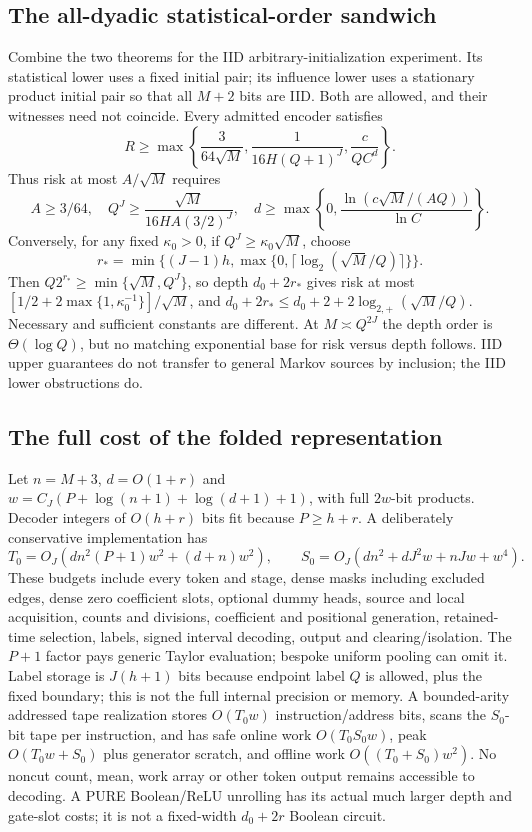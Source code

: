 \documentclass[11pt,letterpaper]{article}
\theoremstyle{definition}\newtheorem{definition}[theorem]{Definition}
\theoremstyle{remark}\newtheorem{remark}[theorem]{Remark}
\begin{document}
\subsection{The all-dyadic statistical-order sandwich}
Combine the two theorems for the IID arbitrary-initialization experiment. Its statistical lower uses a fixed initial pair; its influence lower uses a stationary product initial pair so that all $M+2$ bits are IID. Both are allowed, and their witnesses need not coincide. Every admitted encoder satisfies
\begin{equation}\label{eq:iidsandwich}
 R\ge\max\left\{\frac3{64\sqrt M},\frac1{16H(Q+1)^J},\frac c{QC^d}\right\}.
\end{equation}
Thus risk at most $A/\sqrt M$ requires
\[
 A\ge3/64,\quad Q^J\ge\frac{\sqrt M}{16HA(3/2)^J},\quad
 d\ge\max\left\{0,\frac{\ln(c\sqrt M/(AQ))}{\ln C}\right\}.
\]
Conversely, for any fixed $\kappa_0>0$, if $Q^J\ge\kappa_0\sqrt M$, choose
\[
 r_* =\min\{(J-1)h,\max\{0,\lceil\log_2(\sqrt M/Q)\rceil\}\}.
\]
Then $Q2^{r_*}\ge\min\{\sqrt M,Q^J\}$, so depth $d_0+2r_*$ gives risk at most
$[1/2+2\max\{1,\kappa_0^{-1}\}]/\sqrt M$, and
$d_0+2r_*\le d_0+2+2\log_{2,+}(\sqrt M/Q)$.
Necessary and sufficient constants are different. At $M\asymp Q^{2J}$ the depth order is $\Theta(\log Q)$, but no matching exponential base for risk versus depth follows. IID upper guarantees do not transfer to general Markov sources by inclusion; the IID lower obstructions do.

\subsection{The full cost of the folded representation}
Let $n=M+3$, $d=O(1+r)$ and
$w=C_J(P+\log(n+1)+\log(d+1)+1)$, with full $2w$-bit products. Decoder integers of $O(h+r)$ bits fit because $P\ge h+r$. A deliberately conservative implementation has
\[
 T_0=O_J(dn^2(P+1)w^2+(d+n)w^2),\qquad
 S_0=O_J(dn^2+dJ^2w+nJw+w^4).
\]
These budgets include every token and stage, dense masks including excluded edges, dense zero coefficient slots, optional dummy heads, source and local acquisition, counts and divisions, coefficient and positional generation, retained-time selection, labels, signed interval decoding, output and clearing/isolation. The $P+1$ factor pays generic Taylor evaluation; bespoke uniform pooling can omit it. Label storage is $J(h+1)$ bits because endpoint label $Q$ is allowed, plus the fixed boundary; this is not the full internal precision or memory.
A bounded-arity addressed tape realization stores $O(T_0w)$ instruction/address bits, scans the $S_0$-bit tape per instruction, and has safe online work $O(T_0S_0w)$, peak $O(T_0w+S_0)$ plus generator scratch, and offline work $O((T_0+S_0)w^2)$. No noncut count, mean, work array or other token output remains accessible to decoding. A PURE Boolean/ReLU unrolling has its actual much larger depth and gate-slot costs; it is not a fixed-width $d_0+2r$ Boolean circuit.
\end{document}
